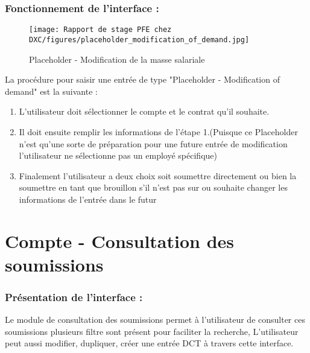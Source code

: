 \subsubsection{Fonctionnement de l'interface :}

\begin{figure}[hbt!]
    \centering
    \texttt{[image: Rapport de stage PFE chez DXC/figures/placeholder\_modification\_of\_demand.jpg]}
    \caption{Placeholder - Modification de la masse salariale}
\end{figure}

La procédure pour saisir une entrée de type "Placeholder - Modification of demand" est la suivante :

\begin{enumerate}
    
    \item L'utilisateur doit sélectionner le compte et le contrat qu'il souhaite.
    \vspace{0.1cm}
    \item Il doit ensuite remplir les informations de l'étape 1.(Puisque ce Placeholder n'est qu'une sorte de préparation pour une future entrée de modification l'utilisateur ne sélectionne pas un employé spécifique)
    \vspace{0.1cm}
    \item Finalement l'utilisateur a deux choix soit soumettre directement ou bien la soumettre en tant que brouillon s'il n'est pas sur ou souhaite changer les informations de l'entrée dans le futur

\end{enumerate}


\section{Compte - Consultation des soumissions}

\subsubsection{Présentation de l'interface :}

Le module de consultation des soumissions permet à l'utilisateur de consulter ces soumissions plusieurs filtre sont présent pour faciliter la recherche, L'utilisateur peut aussi modifier, dupliquer, créer une entrée DCT à travers cette interface.

